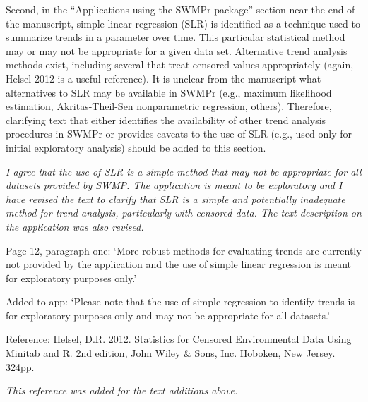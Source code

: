 \documentclass[letterpaper,12pt]{article}\usepackage[]{graphicx}\usepackage[]{color}
\begin{document}
Second, in the ``Applications using the SWMPr package'' section near the end of the manuscript, simple linear regression (SLR) is identified as a technique used to summarize trends in a parameter over time. This particular statistical method may or may not be appropriate for a given data set. Alternative trend analysis methods exist, including several that treat censored values appropriately (again, Helsel 2012 is a useful reference). It is unclear from the manuscript what alternatives to SLR may be available in SWMPr (e.g., maximum likelihood estimation, Akritas-Theil-Sen nonparametric regression, others). Therefore, clarifying text that either identifies the availability of other trend analysis procedures in SWMPr or provides caveats to the use of SLR (e.g., used only for initial exploratory analysis) should be added to this section.

{\it I agree that the use of SLR is a simple method that may not be appropriate for all datasets provided by SWMP.  The application is meant to be exploratory and I have revised the text to clarify that SLR is a simple and potentially inadequate method for trend analysis, particularly with censored data.  The text description on the application was also revised.

Page 12, paragraph one: `More robust methods for evaluating trends are currently not provided by the application and the use of simple linear regression is meant for exploratory purposes only.'

Added to app: `Please note that the use of simple regression to identify trends is for exploratory purposes only and may not be appropriate for all datasets.'
}

Reference:
Helsel, D.R. 2012. Statistics for Censored Environmental Data Using Minitab and R. 2nd edition, John Wiley \& Sons, Inc. Hoboken, New Jersey. 324pp.

{\it This reference was added for the text additions above.}
\end{document}
